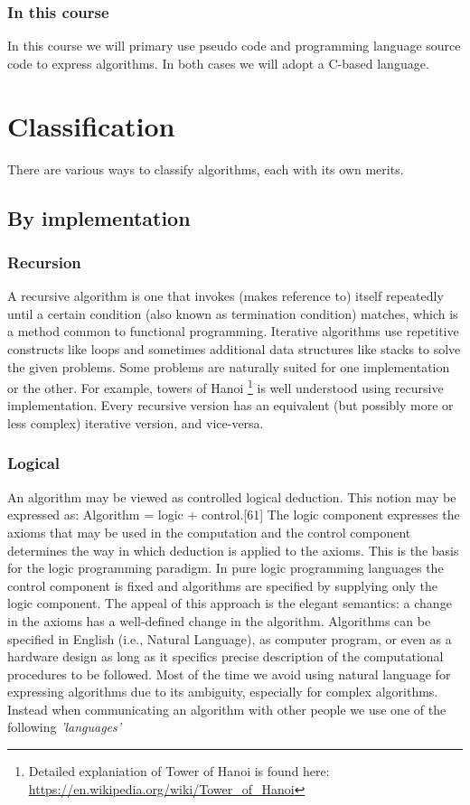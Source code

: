 \documentclass[12pt,a4paper]{book}
\begin{document}
\subsubsection{In this course}
In this course we will primary use pseudo code and programming language source code to express algorithms. In both cases we will adopt a C-based language. 
\section{Classification}
There are various ways to classify algorithms, each with its own merits.
\subsection{By implementation}
\subsubsection{Recursion}
A recursive algorithm is one that invokes (makes reference to) itself repeatedly until a certain condition (also known as termination condition) matches, which is a method common to functional programming. Iterative algorithms use repetitive constructs like loops and sometimes additional data structures like stacks to solve the given problems. Some problems are naturally suited for one implementation or the other. For example, towers of Hanoi \footnote{Detailed explaniation of Tower of Hanoi is found here: \url{https://en.wikipedia.org/wiki/Tower_of_Hanoi}} is well understood using recursive implementation. Every recursive version has an equivalent (but possibly more or less complex) iterative version, and vice-versa.
\subsubsection{Logical}
An algorithm may be viewed as controlled logical deduction. This notion may be expressed as: Algorithm = logic + control.[61] The logic component expresses the axioms that may be used in the computation and the control component determines the way in which deduction is applied to the axioms. This is the basis for the logic programming paradigm. In pure logic programming languages the control component is fixed and algorithms are specified by supplying only the logic component. The appeal of this approach is the elegant semantics: a change in the axioms has a well-defined change in the algorithm.
Algorithms can be specified in English (i.e., Natural Language), as computer program, or even as a hardware design as long as it specifics precise description of the computational procedures to be followed. Most of the time we avoid using natural language for expressing algorithms due to its ambiguity, especially for complex algorithms. Instead when communicating an algorithm with other people we use one of the following \textit{'languages'}
\end{document}
